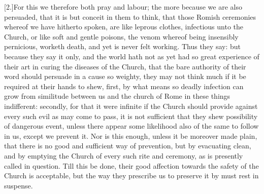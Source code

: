 [2.]For this we therefore both pray and labour; the more because we are also persuaded, that it is but conceit in them to think, that those Romish ceremonies whereof we have hitherto spoken, are like leprous clothes, infectious unto the Church, or like soft and gentle poisons, the venom whereof being insensibly pernicious, worketh death, and yet is never felt working. Thus they say: but because they say it only, and the world hath not as yet had so great experience of their art in curing the diseases of the Church, that the bare authority of their word should persuade in a cause so weighty, they may not think much if it be required at their hands to shew, first, by what means so deadly infection can grow from similitude between us and the church of Rome in these things indifferent: secondly, for that it were infinite if the Church should provide against every such evil as may come to pass, it is not sufficient that they shew possibility of dangerous event, unless there appear some likelihood also of the same to follow in us, except we prevent it. Nor is this enough, unless it be moreover made plain, that there is no good and sufficient way of prevention, but by evacuating clean, and by emptying the Church of every such rite and ceremony, as is presently  called in question. Till this be done, their good affection towards the safety of the Church is acceptable, but the way they prescribe us to preserve it by must rest in suspense.

